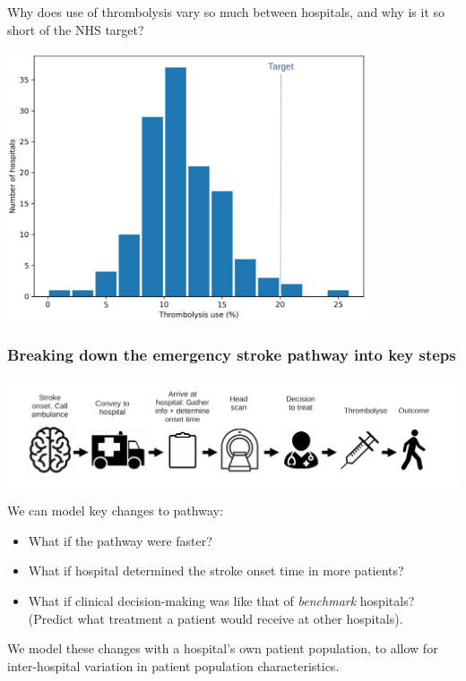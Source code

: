 \documentclass{beamer}
\begin{document}
\begin{frame}{Why does use of thrombolysis vary so much between hospitals, and why is it so short of the NHS target?}

\begin{center}
    \includegraphics[width=0.80\textwidth]{./images/thrombolysis_by_hospital}
\end{center}


\end{frame}



\begin{frame}
\frametitle{Breaking down the emergency stroke pathway into key steps}
\begin{center}
\includegraphics[width=1.0\textwidth]{./images/pathway}
\end{center}
We can model key changes to pathway:
\begin{small}

\begin{itemize}
    \item What if the pathway were faster?
    \item What if hospital determined the stroke onset time in more patients?
    \item What if clinical decision-making was like that of \emph{benchmark} hospitals? (Predict what treatment a patient would receive at other hospitals).
\end{itemize}
\end{small}
\footnotesize{We model these changes with a hospital's own patient population, to allow for inter-hospital variation in patient population characteristics.}
\end{frame}
\end{document}
